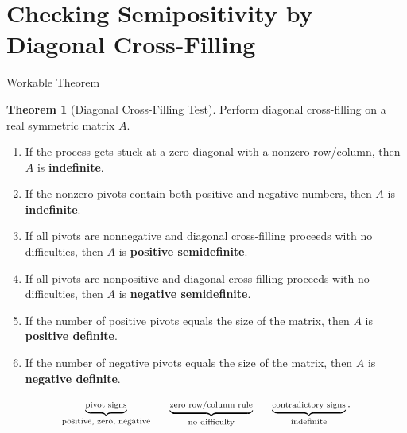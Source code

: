 \documentclass[10pt]{beamer}
\theoremstyle{definition}
\newtheorem{thm}{Theorem}[section]
\newcommand{\x}[1]{\alert{\textbf{#1}}}
\begin{document}
\section{Checking Semipositivity by Diagonal Cross-Filling}


\begin{frame}[shrink=8]{Workable Theorem}

\begin{thm}[Diagonal Cross-Filling Test]
Perform diagonal cross-filling on a real symmetric matrix $A$.
\begin{enumerate}
\item If the process gets stuck at a zero diagonal with a nonzero row/column, then $A$ is \x{indefinite}.
\item If the nonzero pivots contain both positive and negative numbers, then $A$ is \x{indefinite}.
\item If all pivots are nonnegative and diagonal cross-filling proceeds with no difficulties, then $A$ is \x{positive semidefinite}.
\item If all pivots are nonpositive and diagonal cross-filling proceeds with no difficulties, then $A$ is \x{negative semidefinite}.
\item If the number of positive pivots equals the size of the matrix, then $A$ is \x{positive definite}.
\item If the number of negative pivots equals the size of the matrix, then $A$ is \x{negative definite}.
\end{enumerate}
\end{thm}

\vfill

\[
\scriptsize
\underbrace{\text{pivot signs}}_{\text{positive, zero, negative}}
\qquad
\underbrace{\text{zero row/column rule}}_{\text{no difficulty}}
\qquad
\underbrace{\text{contradictory signs}}_{\text{indefinite}}.
\]

\end{frame}
\end{document}
